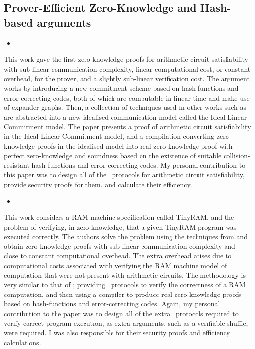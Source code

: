 \subsection*{Prover-Efficient Zero-Knowledge and Hash-based arguments}

\begin{itemize}
\item {}
\end{itemize}

This work gave the first zero-knowledge proofs for arithmetic circuit satisfiability with sub-linear communication complexity, linear computational cost, or constant overhead, for the prover, and a slightly sub-linear verification cost. The argument works by introducing a new commitment scheme based on hash-functions and error-correcting codes, both of which are computable in linear time and make use of expander graphs. Then, a collection of techniques used in other works such as \cite{Groth2009b} are abstracted into a new idealised communication model called the Ideal Linear Commitment model. The paper presents a proof of arithmetic circuit satisfiability in the Ideal Linear Commitment model, and a compilation converting zero-knowledge proofs in the idealised model into real zero-knowledge proof with perfect zero-knowledge and soundness based on the existence of suitable collision-resistant hash-functions and error-correcting codes. My personal contribution to this paper was to design all of the \ILC\ protocols for arithmetic circuit satisfiability, provide security proofs for them, and calculate their efficiency.

\begin{itemize}
\item {}
\end{itemize}

This work considers a RAM machine specification called TinyRAM, and the problem of verifying, in zero-knowledge, that a given TinyRAM program was executed correctly. The authors solve the problem using the techniques from \cite{BootleCGGHJ17} and obtain zero-knowledge proofs with sub-linear communication complexity and close to constant computational overhead. The extra overhead arises due to computational costs associated with verifying the RAM machine model of computation that were not present with arithmetic circuits. The methodology is very similar to that of \cite{BootleCGGHJ17}; providing \ILC\ protocols to verify the correctness of a RAM computation, and then using a compiler to produce real zero-knowledge proofs based on hash-functions and error-correcting codes. Again, my personal contribution to the paper was to design all of the extra \ILC\ protocols required to verify correct program execution, as extra arguments, such as a verifiable shuffle, were required. I was also responsible for their security proofs and efficiency calculations.

